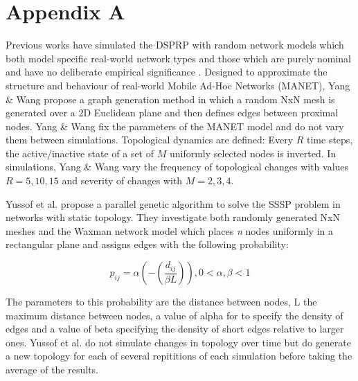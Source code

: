 \documentclass[
	a4paper, %
	10pt, %
	unnumberedsections, %
	twoside, %
]{LTJournalArticle}
\begin{document}

\printbibliography %


\appendix
\chapter{Appendix A} Previous works have simulated the DSPRP with random network models which both model specific real-world network types \cite{yang:10} and those which are purely nominal and have no deliberate empirical significance \cite{yussof:09} \cite{kumar:10} \cite{gonen:11}. Designed to approximate the structure and behaviour of real-world Mobile Ad-Hoc Networks (MANET), Yang \& Wang propose a graph generation method in which a random NxN mesh is generated over a 2D Euclidean plane and then defines edges between proximal nodes. Yang \& Wang fix the parameters of the MANET model and do not vary them between simulations. Topological dynamics are defined: Every \( R \) time steps, the active/inactive state of a set of \( M \) uniformly selected nodes is inverted. In simulations, Yang \& Wang vary the frequency of topological changes with values \( R = 5, 10, 15 \) and severity of changes with \( M = 2, 3, 4 \). 

Yussof et al. propose a parallel genetic algorithm to solve the SSSP problem in networks with static topology. They investigate both randomly generated  NxN meshes and the Waxman network model which places \emph{n} nodes uniformly in a rectangular plane and assigns edges with the following probability: 

\begin{equation}
	p_{ij} = \alpha(-(\frac{d_{ij}}{\beta{L}})), 0 < \alpha{,} \beta < 1 
	\label{eq:waxman}
\end{equation}

The parameters to this probability are the distance between nodes, L the maximum distance between nodes, a value of alpha for to specify the density of edges and a value of beta specifying the density of short edges relative to larger ones. Yussof et al. do not simulate changes in topology over time but do generate a new topology for each of several repititions of each simulation before taking the average of the results. \\
\end{document}
